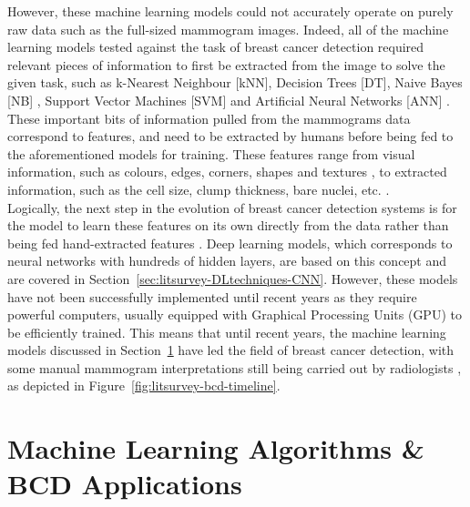 However, these machine learning models could not accurately operate on purely raw data such as the full-sized mammogram images. Indeed, all of the machine learning models tested against the task of breast cancer detection required relevant pieces of information to first be extracted from the image to solve the given task, such as k-Nearest Neighbour [kNN], Decision Trees [DT], Naive Bayes [NB] \citep{Asri2016}, Support Vector Machines [SVM] \citep{Ramos-Pollan2012} and Artificial Neural Networks [ANN] \citep{Yue2018}. These important bits of information pulled from the mammograms data correspond to features, and need to be extracted by humans before being fed to the aforementioned models for training. These features range from visual information, such as colours, edges, corners, shapes and textures \citep{Geron2019}, to extracted information, such as the cell size, clump thickness, bare  nuclei, etc. \citep{Yue2018}.\\

Logically, the next step in the evolution of breast cancer detection systems is for the model to learn these features on its own directly from the data rather than being fed hand-extracted features \citep{Yala2019}. Deep learning models, which corresponds to neural networks with hundreds of hidden layers, are based on this concept and are covered in Section~\ref{sec:litsurvey-DLtechniques-CNN}. However, these models have not been successfully implemented until recent years as they require powerful computers, usually equipped with Graphical Processing Units (GPU) to be efficiently trained. This means that until recent years, the machine learning models discussed in Section~\ref{sec:litreview-MLmodel-BCDapplications} have led the field of breast cancer detection, with some manual mammogram interpretations still being carried out by radiologists \citep{Litjens2017}, as depicted in Figure~\ref{fig:litsurvey-bcd-timeline}.



\section{Machine Learning Algorithms \& BCD Applications}
\label{sec:litreview-MLmodel-BCDapplications}

